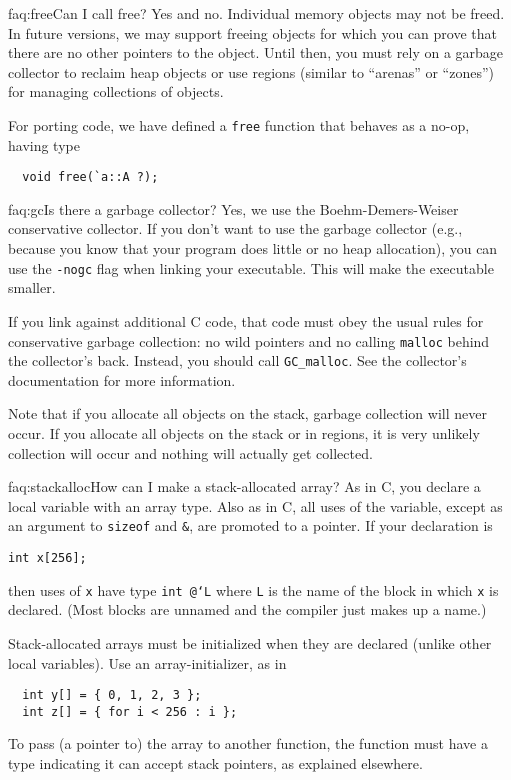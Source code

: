 \begin{faqa}{faq:free}{Can I call free?}
Yes and no. Individual memory objects may not be freed.  In future versions,
we may support freeing objects for which you can prove that there are no
other pointers to the object.  Until then, you must rely on a garbage
collector to reclaim heap objects or use regions (similar to ``arenas'' or
``zones'') for managing collections of objects.

For porting code, we have defined a \texttt{free} function that behaves as a
no-op, having type
\begin{verbatim}
  void free(`a::A ?);
\end{verbatim}
\end{faqa}

\begin{faqa}{faq:gc}{Is there a garbage collector?}
Yes, we use the Boehm-Demers-Weiser conservative collector.  If you
don't want to use the garbage collector (e.g., because you know that
your program does little or no heap allocation), you can use the
\texttt{-nogc} flag when linking your executable.  This will make the
executable smaller.

If you link against additional C code, that code must obey the usual
rules for conservative garbage collection: no wild pointers and no
calling \texttt{malloc} behind the collector's back.  Instead, you
should call \texttt{GC_malloc}.  See the collector's documentation for
more information.

Note that if you allocate all objects on the stack, garbage collection
will never occur.  If you allocate all objects on the stack or in
regions, it is very unlikely collection will occur and nothing will
actually get collected.
\end{faqa}

\begin{faqa}{faq:stackalloc}{How can I make a stack-allocated array?}
As in C, you declare a local variable with an array type.  Also as in
C, all uses of the variable, except as an argument to \texttt{sizeof}
and \texttt{\&}, are promoted to a pointer.  If your declaration is
\begin{verbatim}
int x[256];
\end{verbatim}
then uses of \texttt{x} have type \texttt{int @`L\rb} where
\texttt{L} is the name of the block in which \texttt{x} is declared.
(Most blocks are unnamed and the compiler just makes up a name.)

Stack-allocated arrays must be initialized when they are declared
(unlike other local variables).  Use an array-initializer, as in
\begin{verbatim}
  int y[] = { 0, 1, 2, 3 };
  int z[] = { for i < 256 : i };
\end{verbatim}

To pass (a pointer to) the array to another function, the function
must have a type indicating it can accept stack pointers, as explained
elsewhere.
\end{faqa}

